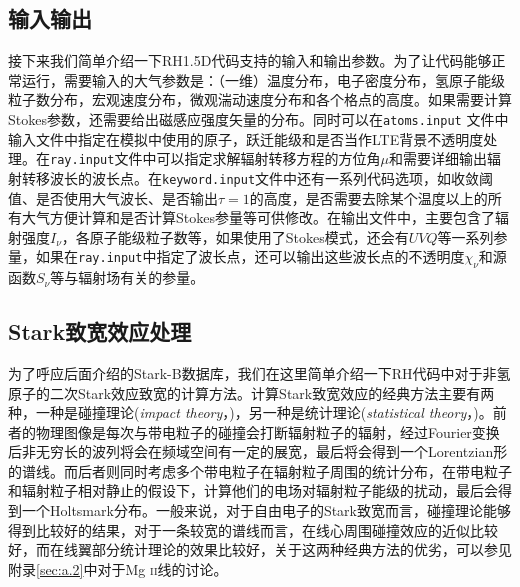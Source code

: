 \subsection{输入输出}
接下来我们简单介绍一下RH1.5D代码支持的输入和输出参数。为了让代码能够正常运行，需要输入的大气参数是：（一维）温度分布，电子密度分布，氢原子能级粒子数分布，宏观速度分布，微观湍动速度分布和各个格点的高度。如果需要计算Stokes参数，还需要给出磁感应强度矢量的分布。同时可以在\texttt{atoms.input} 文件中输入文件中指定在模拟中使用的原子，跃迁能级和是否当作LTE背景不透明度处理。在\texttt{ray.input}文件中可以指定求解辐射转移方程的方位角$\mu$和需要详细输出辐射转移波长的波长点。在\texttt{keyword.input}文件中还有一系列代码选项，如收敛阈值、是否使用大气波长、是否输出$\tau=1$的高度，是否需要去除某个温度以上的所有大气方便计算和是否计算Stokes参量等可供修改。在输出文件中，主要包含了辐射强度$I_{\nu}$，各原子能级粒子数等，如果使用了Stokes模式，还会有$UVQ$等一系列参量，如果在\texttt{ray.input}中指定了波长点，还可以输出这些波长点的不透明度$\chi_\nu$和源函数$S_\nu$等与辐射场有关的参量。
\subsection{Stark致宽效应处理}\label{sec:2.2.3}
为了呼应后面介绍的Stark-B数据库，我们在这里简单介绍一下RH代码中对于非氢原子的二次Stark效应致宽的计算方法。计算Stark致宽效应的经典方法主要有两种，一种是碰撞理论(\textit{impact theory}，\cites{Weisskopf1932})，另一种是统计理论(\textit{statistical theory}，\cites{Holtsmark1919})。前者的物理图像是每次与带电粒子的碰撞会打断辐射粒子的辐射，经过Fourier变换后非无穷长的波列将会在频域空间有一定的展宽，最后将会得到一个Lorentzian形的谱线。而后者则同时考虑多个带电粒子在辐射粒子周围的统计分布，在带电粒子和辐射粒子相对静止的假设下，计算他们的电场对辐射粒子能级的扰动，最后会得到一个Holtsmark分布。一般来说，对于自由电子的Stark致宽而言，碰撞理论能够得到比较好的结果，对于一条较宽的谱线而言，在线心周围碰撞效应的近似比较好，而在线翼部分统计理论的效果比较好，关于这两种经典方法的优劣，可以参见附录\ref{sec:a.2}中对于Mg \textsc{ii}线的讨论。


